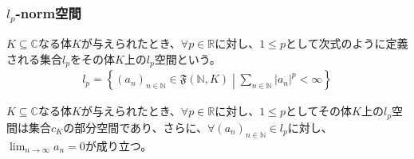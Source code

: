 \documentclass[dvipdfmx]{jsarticle}
\begin{document}
\subsubsection{$l_{p}$-norm空間}%
\begin{dfn}
$K \subseteq \mathbb{C}$なる体$K$が与えられたとき、$\forall p \in \mathbb{R}$に対し、$1 \leq p$として次式のように定義される集合$l_{p}$をその体$K$上の$l_{p}$空間という。
\begin{align*}
l_{p} = \left\{ \left( a_{n} \right)_{n \in \mathbb{N}}\in \mathfrak{F}\left( \mathbb{N},K \right) \middle| \sum_{n \in \mathbb{N}} \left| a_{n} \right|^{p} < \infty \right\}
\end{align*}
\end{dfn}
\begin{thm}\label{2.3.3.3}
$K \subseteq \mathbb{C}$なる体$K$が与えられたとき、$\forall p \in \mathbb{R}$に対し、$1 \leq p$としてその体$K$上の$l_{p}$空間は集合$c_{K}$の部分空間であり、さらに、$\forall\left( a_{n} \right)_{n \in \mathbb{N}} \in l_{p}$に対し、$\lim_{n \rightarrow \infty}a_{n} = 0$が成り立つ。
\end{thm}
\end{document}
